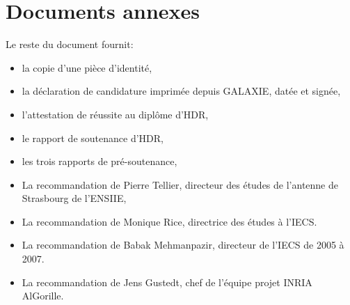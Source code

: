 \documentclass[11pt]{article}
\begin{document}

%



\newpage
\section{Documents annexes}

Le reste du document fournit:\\
\begin{itemize}
\item la copie d'une pièce d'identité,
\item la déclaration de candidature imprimée depuis GALAXIE, datée et signée,
\item l'attestation de réussite au diplôme d'HDR,
\item le rapport de soutenance d'HDR,
\item les trois rapports de pré-soutenance,
\item La recommandation de Pierre Tellier, directeur des études de l'antenne de Strasbourg de l'ENSIIE,
\item La recommandation de Monique Rice, directrice des études à l'IECS.
\item La recommandation de Babak Mehmanpazir, directeur de l'IECS de 2005 à 2007.
\item La recommandation de Jens Gustedt, chef de l'équipe projet INRIA AlGorille. 
\end{itemize}
\end{document}
